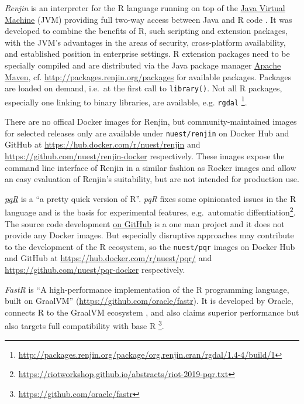 \emph{Renjin} is an interpreter for the R language running on top of the
\href{https://en.wikipedia.org/wiki/Java_virtual_machine}{Java Virtual
Machine} (JVM) providing full two-way access between Java and R code
\citep{wikipedia_renjin_2018}. It was developed to combine the benefits
of R, such scripting and extension packages, with the JVM's advantages
in the areas of security, cross-platform availability, and established
position in enterprise settings. R extension packages need to be
specially compiled and are distributed via the Java package manager
\href{https://en.wikipedia.org/wiki/Apache_Maven}{Apache Maven}, cf.
\url{http://packages.renjin.org/packages} for available packages.
Packages are loaded on demand, i.e.~at the first call to
\texttt{library()}. Not all R packages, especially one linking to binary
libraries, are available, e.g. \texttt{rgdal}
\footnote{\href{http://packages.renjin.org/package/org.renjin.cran/rgdal/1.4-4/build/1}{http://packages.renjin.org/package/org.renjin.cran/rgdal/1.4-4/build/1}}.

There are no offical Docker images for Renjin, but community-maintained
images for selected releases only are available under
\texttt{nuest/renjin} on Docker Hub and GitHub at
\url{https://hub.docker.com/r/nuest/renjin} and
\url{https://github.com/nuest/renjin-docker} respectively. These images
expose the command line interface of Renjin in a similar fashion as
Rocker images and allow an easy evaluation of Renjin's suitability, but
are not intended for production use.

\href{http://www.pqr-project.org/}{\emph{pqR}} is a ``a pretty quick
version of R''. \emph{pqR} fixes some opinionated issues in the R
language and is the basis for experimental features, e.g.~automatic
diffentiation\footnote{ \href{https://riotworkshop.github.io/abstracts/riot-2019-pqr.txt}{https://riotworkshop.github.io/abstracts/riot-2019-pqr.txt}}.
The source code development
\href{https://github.com/radfordneal/pqR/}{on GitHub} is a one man
project and it does not provide any Docker images. But especially
disruptive approaches may contribute to the development of the R
ecosystem, so the \texttt{nuest/pqr} images on Docker Hub and GitHub at
\url{https://hub.docker.com/r/nuest/pqr/} and
\url{https://github.com/nuest/pqr-docker} respectively.

\emph{FastR} is ``A high-performance implementation of the R programming
language, built on GraalVM'' (\url{https://github.com/oracle/fastr}). It
is developed by Oracle, connects R to the GraalVM ecosystem
\citep{wikipedia_graalvm_2019}, and also claims superior performance but
also targets full compatibility with base R
\footnote{ \href{https://github.com/oracle/fastr}{https://github.com/oracle/fastr}}.


